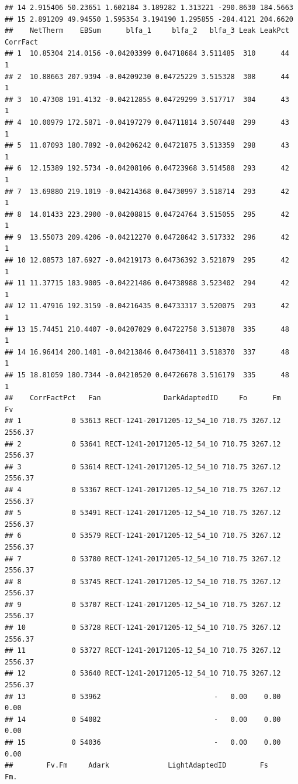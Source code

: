 \documentclass[]{krantz}
\theoremstyle{definition}
\theoremstyle{definition}
\theoremstyle{definition}
\theoremstyle{remark}
\begin{document}
\begin{verbatim}
## 14 2.915406 50.23651 1.602184 3.189282 1.313221 -290.8630 184.5663
## 15 2.891209 49.94550 1.595354 3.194190 1.295855 -284.4121 204.6620
##    NetTherm    EBSum      blfa_1     blfa_2   blfa_3 Leak LeakPct CorrFact
## 1  10.85304 214.0156 -0.04203399 0.04718684 3.511485  310      44        1
## 2  10.88663 207.9394 -0.04209230 0.04725229 3.515328  308      44        1
## 3  10.47308 191.4132 -0.04212855 0.04729299 3.517717  304      43        1
## 4  10.00979 172.5871 -0.04197279 0.04711814 3.507448  299      43        1
## 5  11.07093 180.7892 -0.04206242 0.04721875 3.513359  298      43        1
## 6  12.15389 192.5734 -0.04208106 0.04723968 3.514588  293      42        1
## 7  13.69880 219.1019 -0.04214368 0.04730997 3.518714  293      42        1
## 8  14.01433 223.2900 -0.04208815 0.04724764 3.515055  295      42        1
## 9  13.55073 209.4206 -0.04212270 0.04728642 3.517332  296      42        1
## 10 12.08573 187.6927 -0.04219173 0.04736392 3.521879  295      42        1
## 11 11.37715 183.9005 -0.04221486 0.04738988 3.523402  294      42        1
## 12 11.47916 192.3159 -0.04216435 0.04733317 3.520075  293      42        1
## 13 15.74451 210.4407 -0.04207029 0.04722758 3.513878  335      48        1
## 14 16.96414 200.1481 -0.04213846 0.04730411 3.518370  337      48        1
## 15 18.81059 180.7344 -0.04210520 0.04726678 3.516179  335      48        1
##    CorrFactPct   Fan               DarkAdaptedID     Fo      Fm      Fv
## 1            0 53613 RECT-1241-20171205-12_54_10 710.75 3267.12 2556.37
## 2            0 53641 RECT-1241-20171205-12_54_10 710.75 3267.12 2556.37
## 3            0 53614 RECT-1241-20171205-12_54_10 710.75 3267.12 2556.37
## 4            0 53367 RECT-1241-20171205-12_54_10 710.75 3267.12 2556.37
## 5            0 53491 RECT-1241-20171205-12_54_10 710.75 3267.12 2556.37
## 6            0 53579 RECT-1241-20171205-12_54_10 710.75 3267.12 2556.37
## 7            0 53780 RECT-1241-20171205-12_54_10 710.75 3267.12 2556.37
## 8            0 53745 RECT-1241-20171205-12_54_10 710.75 3267.12 2556.37
## 9            0 53707 RECT-1241-20171205-12_54_10 710.75 3267.12 2556.37
## 10           0 53728 RECT-1241-20171205-12_54_10 710.75 3267.12 2556.37
## 11           0 53727 RECT-1241-20171205-12_54_10 710.75 3267.12 2556.37
## 12           0 53640 RECT-1241-20171205-12_54_10 710.75 3267.12 2556.37
## 13           0 53962                           -   0.00    0.00    0.00
## 14           0 54082                           -   0.00    0.00    0.00
## 15           0 54036                           -   0.00    0.00    0.00
##        Fv.Fm     Adark              LightAdaptedID        Fs      Fm.

\end{verbatim}
\end{document}
